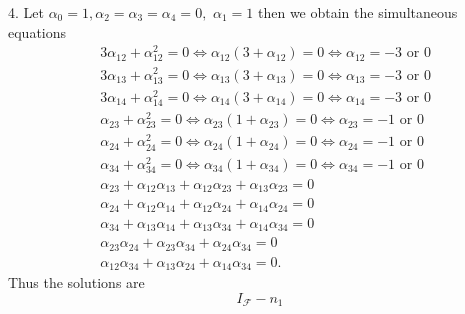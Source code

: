 \documentclass[aps,preprint]{revtex4}%
\begin{document}
4. Let $\alpha_{0}=1,\alpha_{2}=\alpha_{3}=\alpha_{4}=0,$ $\alpha_{1}=1$ then
we obtain the simultaneous equations
\begin{align}
&  3\alpha_{12}+\alpha_{12}^{2}=0\Leftrightarrow\alpha_{12}\left(
3+\alpha_{12}\right)  =0\Leftrightarrow\alpha_{12}=-3\text{ or }0\nonumber\\
&  3\alpha_{13}+\alpha_{13}^{2}=0\Leftrightarrow\alpha_{13}\left(
3+\alpha_{13}\right)  =0\Leftrightarrow\alpha_{13}=-3\text{ or }0\nonumber\\
&  3\alpha_{14}+\alpha_{14}^{2}=0\Leftrightarrow\alpha_{14}\left(
3+\alpha_{14}\right)  =0\Leftrightarrow\alpha_{14}=-3\text{ or }0\nonumber\\
&  \alpha_{23}+\alpha_{23}^{2}=0\Leftrightarrow\alpha_{23}\left(
1+\alpha_{23}\right)  =0\Leftrightarrow\alpha_{23}=-1\text{ or }0\nonumber\\
&  \alpha_{24}+\alpha_{24}^{2}=0\Leftrightarrow\alpha_{24}\left(
1+\alpha_{24}\right)  =0\Leftrightarrow\alpha_{24}=-1\text{ or }0\nonumber\\
&  \alpha_{34}+\alpha_{34}^{2}=0\Leftrightarrow\alpha_{34}\left(
1+\alpha_{34}\right)  =0\Leftrightarrow\alpha_{34}=-1\text{ or }0\nonumber\\
&  \alpha_{23}+\alpha_{12}\alpha_{13}+\alpha_{12}\alpha_{23}+\alpha_{13}%
\alpha_{23}=0\nonumber\\
&  \alpha_{24}+\alpha_{12}\alpha_{14}+\alpha_{12}\alpha_{24}+\alpha_{14}%
\alpha_{24}=0\nonumber\\
&  \alpha_{34}+\alpha_{13}\alpha_{14}+\alpha_{13}\alpha_{34}+\alpha_{14}%
\alpha_{34}=0\nonumber\\
&  \alpha_{23}\alpha_{24}+\alpha_{23}\alpha_{34}+\alpha_{24}\alpha
_{34}=0\nonumber\\
&  \alpha_{12}\alpha_{34}+\alpha_{13}\alpha_{24}+\alpha_{14}\alpha_{34}=0.
\end{align}
Thus the solutions are
\[
I_{\mathcal{F}}-n_{1}%
\]
\end{document}
